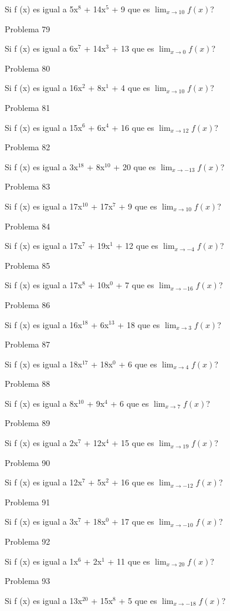 \documentclass{article}
\begin{document}
Si f (x) es igual a 5x$^{8}$ +  14x${^5}$ + 9 que es $\lim_{x\to 10} f(x) $?

Problema 79

Si f (x) es igual a 6x$^{7}$ +  14x${^3}$ + 13 que es $\lim_{x\to 0} f(x) $?

Problema 80

Si f (x) es igual a 16x$^{2}$ +  8x${^1}$ + 4 que es $\lim_{x\to 10} f(x) $?

Problema 81

Si f (x) es igual a 15x$^{6}$ +  6x${^4}$ + 16 que es $\lim_{x\to 12} f(x) $?

Problema 82

Si f (x) es igual a 3x$^{18}$ +  8x${^10}$ + 20 que es $\lim_{x\to -13} f(x) $?

Problema 83

Si f (x) es igual a 17x$^{10}$ +  17x${^7}$ + 9 que es $\lim_{x\to 10} f(x) $?

Problema 84

Si f (x) es igual a 17x$^{7}$ +  19x${^1}$ + 12 que es $\lim_{x\to -4} f(x) $?

Problema 85

Si f (x) es igual a 17x$^{8}$ +  10x${^0}$ + 7 que es $\lim_{x\to -16} f(x) $?

Problema 86

Si f (x) es igual a 16x$^{18}$ +  6x${^13}$ + 18 que es $\lim_{x\to 3} f(x) $?

Problema 87

Si f (x) es igual a 18x$^{17}$ +  18x${^0}$ + 6 que es $\lim_{x\to 4} f(x) $?

Problema 88

Si f (x) es igual a 8x$^{10}$ +  9x${^4}$ + 6 que es $\lim_{x\to 7} f(x) $?

Problema 89

Si f (x) es igual a 2x$^{7}$ +  12x${^4}$ + 15 que es $\lim_{x\to 19} f(x) $?

Problema 90

Si f (x) es igual a 12x$^{7}$ +  5x${^2}$ + 16 que es $\lim_{x\to -12} f(x) $?

Problema 91

Si f (x) es igual a 3x$^{7}$ +  18x${^0}$ + 17 que es $\lim_{x\to -10} f(x) $?

Problema 92

Si f (x) es igual a 1x$^{6}$ +  2x${^1}$ + 11 que es $\lim_{x\to 20} f(x) $?

Problema 93

Si f (x) es igual a 13x$^{20}$ +  15x${^8}$ + 5 que es $\lim_{x\to -18} f(x) $?
\end{document}
